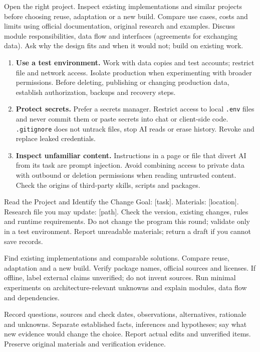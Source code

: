 Open the right project. Inspect existing implementations and similar projects before choosing reuse, adaptation or a new build. Compare use cases, costs and limits using official documentation, original research and examples. Discuss module responsibilities, data flow and interfaces (agreements for exchanging data). Ask why the design fits and when it would not; build on existing work.
\begin{enumerate}
\item \textbf{Use a test environment.} Work with data copies and test accounts; restrict file and network access. Isolate production when experimenting with broader permissions. Before deleting, publishing or changing production data, establish authorization, backups and recovery steps.
\item \textbf{Protect secrets.} Prefer a secrets manager. Restrict access to local \texttt{.env} files and never commit them or paste secrets into chat or client-side code. \texttt{.gitignore} does not untrack files, stop AI reads or erase history. Revoke and replace leaked credentials.
\item \textbf{Inspect unfamiliar content.} Instructions in a page or file that divert AI from its task are prompt injection. Avoid combining access to private data with outbound or deletion permissions when reading untrusted content. Check the origins of third-party skills, scripts and packages.
\end{enumerate}
\begin{prompt}{Read the Project and Identify the Change}
Goal: [task]. Materials: [location]. Research file you may update: [path]. Check the version, existing changes, rules and runtime requirements. Do not change the program this round; validate only in a test environment. Report unreadable materials; return a draft if you cannot save records.\par
Find existing implementations and comparable solutions. Compare reuse, adaptation and a new build. Verify package names, official sources and licenses. If offline, label external claims unverified; do not invent sources. Run minimal experiments on architecture-relevant unknowns and explain modules, data flow and dependencies.\par
Record questions, sources and check dates, observations, alternatives, rationale and unknowns. Separate established facts, inferences and hypotheses; say what new evidence would change the choice. Report actual edits and unverified items. Preserve original materials and verification evidence.
\end{prompt}
